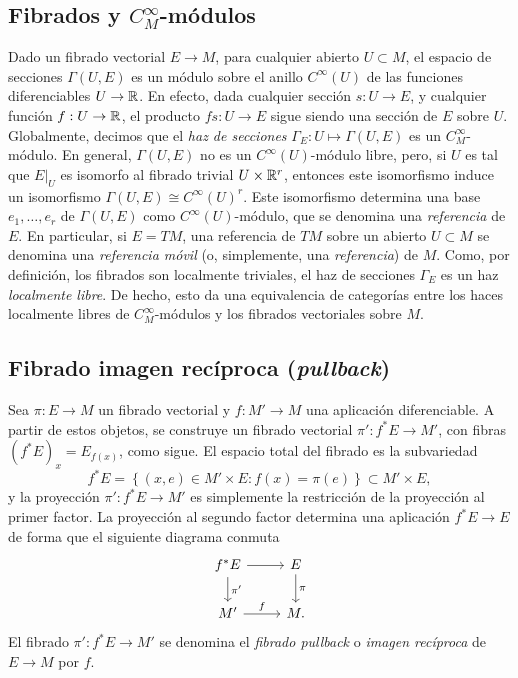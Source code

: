 \documentclass[11pt,a4paper]{amsbook}
\theoremstyle{remark} \newtheorem{rmk}[subsection]{Observación}
\theoremstyle{definition} \newtheorem{defn}[subsection]{Definición}
\theoremstyle{definition} \newtheorem{ex}[subsection]{Ejemplo}
\theoremstyle{definition} \newtheorem{ej}[subsection]{Ejercicio}
\begin{document}
\subsection{Fibrados y $C^\infty_M$-módulos} Dado un fibrado vectorial $E\rightarrow M$, para cualquier abierto $U\subset M$, el espacio de secciones $\Gamma(U,E)$ es un módulo sobre el anillo $C^\infty(U)$ de las funciones diferenciables $U\rightarrow \mathbb R$. En efecto, dada cualquier sección $s:U\rightarrow E$, y cualquier función $f:U\rightarrow \mathbb R$, el producto $fs:U\rightarrow E$ sigue siendo una sección de $E$ sobre $U$. Globalmente, decimos que el \emph{haz de secciones} $\Gamma_E:U\mapsto \Gamma(U,E)$ es un $C^\infty_M$-módulo. En general, $\Gamma(U,E)$ no es un $C^\infty(U)$-módulo libre, pero, si $U$ es tal que $E|_U$ es isomorfo al fibrado trivial $U\times \mathbb R^r$, entonces este isomorfismo induce un isomorfismo $\Gamma(U,E)\cong C^\infty(U)^r$. Este isomorfismo determina una base $e_1,\dots,e_r$ de $\Gamma(U,E)$ como $C^\infty(U)$-módulo, que se denomina una \emph{referencia} de $E$. En particular, si $E=TM$, una referencia de $TM$ sobre un abierto $U\subset M$ se denomina una \emph{referencia móvil} (o, simplemente, una \emph{referencia}) de $M$. Como, por definición, los fibrados son localmente triviales, el haz de secciones $\Gamma_E$ es un haz \emph{localmente libre}. De hecho, esto da una equivalencia de categorías entre los haces localmente libres de $C^\infty_M$-módulos y los fibrados vectoriales sobre $M$.

\subsection{Fibrado imagen recíproca (\textit{pullback})} Sea $\pi:E\rightarrow M$ un fibrado vectorial y $f:M' \rightarrow M$ una aplicación diferenciable. A partir de estos objetos, se construye un fibrado vectorial $\pi':f^*E\rightarrow M'$, con fibras $(f^*E)_{x}=E_{f(x)}$, como sigue. El espacio total del fibrado es la subvariedad
\begin{equation*}
f^* E = \left\{ (x,e) \in M'\times E: f(x)=\pi(e) \right\} \subset M' \times E,
\end{equation*}
y la proyección $\pi':f^*E \rightarrow M'$ es simplemente la restricción de la proyección al primer factor. La proyección al segundo factor determina una aplicación $f^*E\rightarrow E$ de forma que el siguiente diagrama conmuta
\begin{equation*}
  \begin{tikzcd}
f^*E    \ar{r} \ar{d}{\pi'} & E \ar{d}{\pi} \\
M'    \ar{r}{f} & M.
  \end{tikzcd}
\end{equation*}
El fibrado $\pi':f^*E\rightarrow M'$ se denomina el \emph{fibrado \textit{pullback}} o \emph{imagen recíproca} de $E\rightarrow M$ por $f$.
\end{document}
